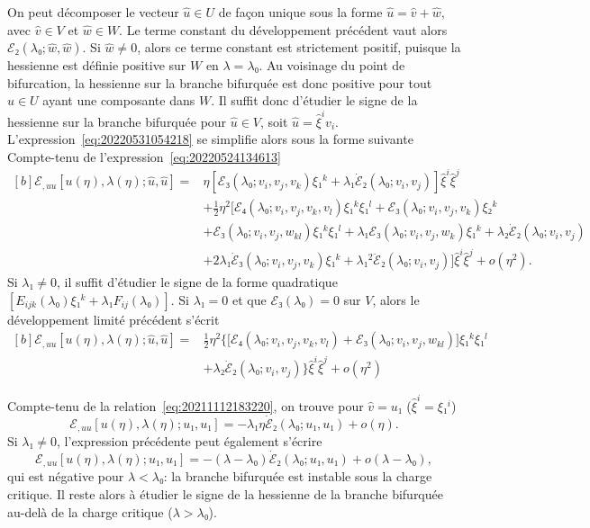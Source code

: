 \documentclass[12pt, final]{amsart}
\theoremstyle{definition}
\begin{document}
On peut décomposer le vecteur \(\hat{u}∈U\) de façon unique sous la forme
\(\hat{u} = \hat{v} + \hat{w}\), avec \(\hat{v}∈V\) et \(\hat{w}∈W\). Le terme
constant du développement précédent vaut alors \(ℰ₂(λ₀; \hat{w}, \hat{w})\). Si
\(\hat{w} ≠ 0\), alors ce terme constant est strictement positif, puisque la
hessienne est définie positive sur \(W\) en \(λ = λ₀\). Au voisinage du point de
bifurcation, la hessienne sur la branche bifurquée est donc positive pour tout
\(\hat{u}∈U\) ayant une composante dans \(W\). Il suffit donc d'étudier le signe
de la hessienne sur la branche bifurquée pour \(\hat{u}∈V\), soit
\(\hat{u} = \hat{ξ}^i v_i\). L'expression~\eqref{eq:20220531054218} se simplifie
alors sous la forme suivante Compte-tenu de
l'expression~\eqref{eq:20220524134613}
\begin{equation}
  \begin{aligned}[b]
    ℰ_{, uu}[u(η), λ(η); \hat{u}, \hat{u}] ={}
    & η [ℰ₃(λ₀; v_i, v_j, v_k) ξ₁^k + λ₁ \dot{ℰ}₂(λ₀; v_i, v_j)] \hat{ξ}^i \hat{ξ}^j\\
    & + \tfrac{1}{2} η^2 \bigl[ℰ₄(λ₀; v_i, v_j, v_k, v_l) ξ₁^k ξ₁^l + ℰ₃(λ₀; v_i, v_j, v_k) ξ₂^k\\
    & + ℰ₃(λ₀; v_i, v_j, w_{k l}) ξ₁^k ξ₁^l + λ₁ ℰ₃(λ₀; v_i, v_j, w_k) ξ₁^k + λ₂ \dot{ℰ}₂(λ₀; v_i, v_j)\\
    & + 2 λ₁ \dot{ℰ}₃(λ₀; v_i, v_j, v_k) ξ₁^k + λ₁^2 \ddot{ℰ}₂(λ₀; v_i, v_j)\bigr] \hat{ξ}^i \hat{ξ}^j + o(η^2).
  \end{aligned}
\end{equation}
Si \(λ₁ ≠ 0\), il suffit d'étudier le signe de la forme quadratique
\([E_{i j k}(λ₀) ξ₁^k + λ₁ F_{i j}(λ₀)].\) Si \(λ₁ = 0\) et que \(ℰ₃(λ₀) = 0\)
sur \(V\), alors le développement limité précédent s'écrit
\begin{equation}
  \begin{aligned}[b]
    ℰ_{, uu} [u(η), λ(η); \hat{u}, \hat{u}] ={}
    & \tfrac{1}{2} η^2 \bigl\{ \bigl[ℰ₄(λ₀; v_i, v_j, v_k, v_l) + ℰ₃(λ₀; v_i, v_j, w_{k l})\bigr] ξ₁^k ξ₁^l\\
    & + λ₂ \dot{ℰ}₂(λ₀; v_i, v_j) \bigr\} \hat{ξ}^i \hat{ξ}^j + o(η^2)
  \end{aligned}
\end{equation}

Compte-tenu de la relation~\eqref{eq:20211112183220}, on trouve pour
\(\hat{v} = u₁\) (\(\hat{ξ}^i = ξ₁^i\))
\begin{equation}
 ℰ_{, uu} [u(η), λ(η); u₁, u₁] = -λ₁ η \dot{ℰ}₂(λ₀; u₁, u₁) + o(η).
\end{equation}
Si \(λ₁ \neq 0\), l'expression précédente peut également s'écrire
\begin{equation}
 ℰ_{, uu} [u(η), λ(η); u₁, u₁] = -(λ - λ₀) \dot{ℰ}₂(λ₀; u₁, u₁) + o(λ - λ₀),
\end{equation}
qui est négative pour \(λ < λ₀\): la branche bifurquée est instable sous la
charge critique. Il reste alors à étudier le signe de la hessienne de la branche
bifurquée au-delà de la charge critique (\(λ > λ₀\)).
\end{document}
